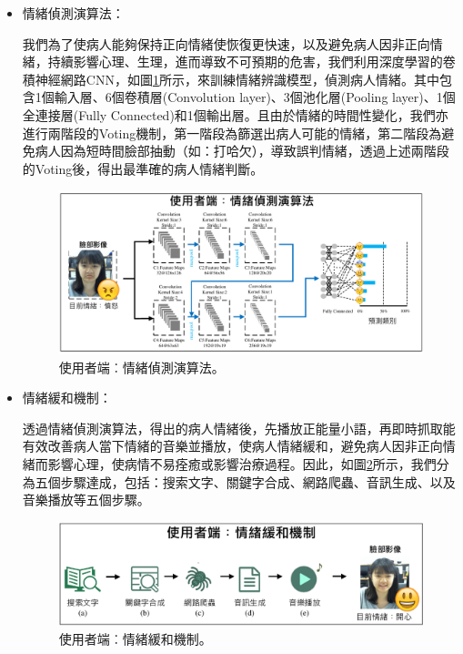 \documentclass[12pt]{scrreprt}
\begin{document}
\begin{itemize}
\item{\begin{bfseries}{情緒偵測演算法：}\end{bfseries}}我們為了使病人能夠保持正向情緒使恢復更快速，以及避免病人因非正向情緒，持續影響心理、生理，進而導致不可預期的危害，我們利用深度學習的卷積神經網路CNN，如圖\ref{fig:framework-version3}所示，來訓練情緒辨識模型，偵測病人情緒。其中包含1個輸入層、6個卷積層(Convolution layer)、3個池化層(Pooling layer)、1個全連接層(Fully Connected)和1個輸出層。且由於情緒的時間性變化，我們亦進行兩階段的Voting機制，第一階段為篩選出病人可能的情緒，第二階段為避免病人因為短時間臉部抽動（如：打哈欠），導致誤判情緒，透過上述兩階段的Voting後，得出最準確的病人情緒判斷。\\

\vspace{-0.9cm}
\begin{figure}[!h]
\begin{center}
\includegraphics[width=1\textwidth]{./figs/framework-version3.pdf}
\end{center}
\vspace{-0.5cm}
\caption{使用者端︰情緒偵測演算法。}
\label{fig:framework-version3}
\end{figure}

\vspace{-0.5cm}
\item{\begin{bfseries}{情緒緩和機制：}\end{bfseries}}透過情緒偵測演算法，得出的病人情緒後，先播放正能量小語，再即時抓取能有效改善病人當下情緒的音樂並播放，使病人情緒緩和，避免病人因非正向情緒而影響心理，使病情不易痊癒或影響治療過程。因此，如圖\ref{fig:FrameworkSecond}所示，我們分為五個步驟達成，包括：搜索文字、關鍵字合成、網路爬蟲、音訊生成、以及音樂播放等五個步驟。

\begin{figure}[!h]
\begin{center}
\includegraphics[width=.9\textwidth]{./figs/FrameworkSecond.pdf}
\end{center}
\vspace{-0.5cm}
\caption{使用者端︰情緒緩和機制。}
\label{fig:FrameworkSecond}
\end{figure}


\end{itemize}
\end{document}
